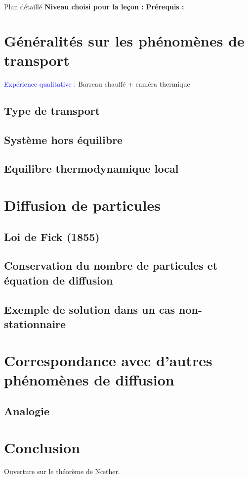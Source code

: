 \begin{reportBlock}{Plan détaillé}
  \textbf{Niveau choisi pour la leçon :} 
  \newline
  \textbf{Prérequis : }
  \newline


\section{Généralités sur les phénomènes de transport}

\textcolor{blue}{Expérience qualitative :} Barreau  chauffé + caméra thermique
\subsection{Type de transport}
\subsection{Système hors équilibre}
\subsection{Equilibre thermodynamique local}

\section{Diffusion de particules}

\subsection{Loi de Fick (1855)}
\subsection{Conservation du nombre de particules et équation de diffusion}
\subsection{Exemple de solution dans un cas non-stationnaire}

\section{Correspondance avec d'autres phénomènes de diffusion}

\subsection{Analogie}


\section*{Conclusion}
Ouverture sur le théorème de N\oe ther.

\end{reportBlock}